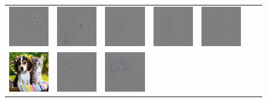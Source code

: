 \begin{figure}
\begin{center}
\begin{tabular}{ccccccc}
\includegraphics[width=0.14\linewidth,height=0.11\linewidth]{figs/class_compare/googlenet/soft/dog-cat1_diff_163} &
\includegraphics[width=0.14\linewidth,height=0.11\linewidth]{figs/class_compare/googlenet/soft/dog-cat1_diff_188} &
\includegraphics[width=0.14\linewidth,height=0.11\linewidth]{figs/class_compare/googlenet/soft/dog-cat1_diff_279} &
\includegraphics[width=0.14\linewidth,height=0.11\linewidth]{figs/class_compare/googlenet/soft/dog-cat1_diff_293} &
\includegraphics[width=0.14\linewidth,height=0.11\linewidth]{figs/class_compare/googlenet/soft/dog-cat1_diff_10} \\
\vspace{-2.5pt}
\includegraphics[width=0.14\linewidth,height=0.11\linewidth]{figs/class_compare/googlenet/soft/dog-cat2} &
\includegraphics[width=0.14\linewidth,height=0.11\linewidth]{figs/class_compare/googlenet/soft/dog-cat2_diff_258} &
\includegraphics[width=0.14\linewidth,height=0.11\linewidth]{figs/class_compare/googlenet/soft/dog-cat2_diff_163} &

\end{tabular}
\end{center}
\end{figure}
